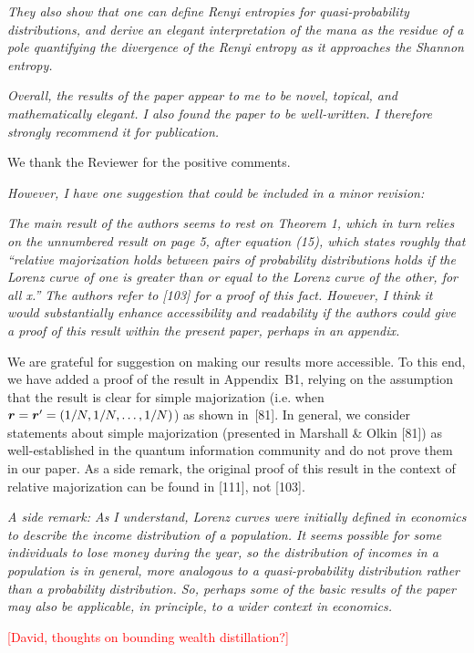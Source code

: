 \documentclass[11pt]{letter}
\newcommand{\nick}[1]{\textcolor{red}{[#1]}}
\begin{document}
\textit{They also show that one can define Renyi entropies for quasi-probability distributions, and derive an elegant interpretation of the mana as the residue of a pole quantifying the divergence of the Renyi entropy as it approaches the Shannon entropy.}

\textit{Overall, the results of the paper appear to me to be novel, topical, and mathematically elegant. I also found the paper to be well-written. I therefore strongly recommend it for publication.}

We thank the Reviewer for the positive comments.

\textit{However, I have one suggestion that could be included in a minor revision:}

\textit{The main result of the authors seems to rest on Theorem 1, which in turn relies on the unnumbered result on page 5, after equation (15), which states roughly that “relative majorization holds between pairs of probability distributions holds if the Lorenz curve of one is greater than or equal to the Lorenz curve of the other, for all x.” The authors refer to [103] for a proof of this fact. However, I think it would substantially enhance accessibility and readability if the authors could give a proof of this result within the present paper, perhaps in an appendix.}

We are grateful for suggestion on making our results more accessible.
To this end, we have added a proof of the result in Appendix~B1, relying on the assumption that the result is clear for simple majorization (i.e. when $\boldsymbol{r} = \boldsymbol{r}'= (1/N,1/N,\dots,1/N)$) as shown in~[81]. 
In general, we consider statements about simple majorization (presented in Marshall \& Olkin [81]) as well-established in the quantum information community and do not prove them in our paper.
As a side remark, the original proof of this result in the context of relative majorization can be found in [111], not [103].

\textit{A side remark: As I understand, Lorenz curves were initially defined in economics to describe the income distribution of a population. It seems possible for some individuals to lose money during the year, so the distribution of incomes in a population is in general, more analogous to a quasi-probability distribution rather than a probability distribution. So, perhaps some of the basic results of the paper may also be applicable, in principle, to a wider context in economics.}

\nick{David, thoughts on bounding wealth distillation?}\\
\end{document}
